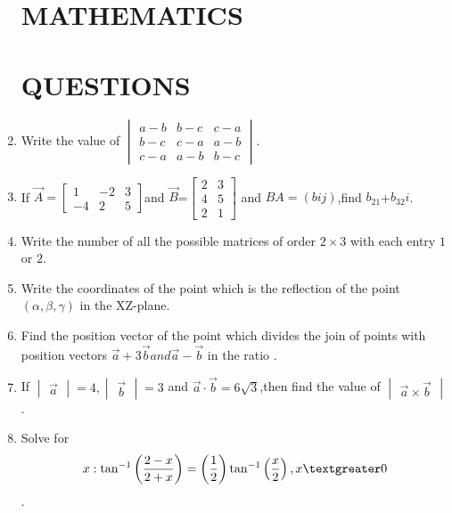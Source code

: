 \documentclass[12pt,-letter paper]{article}
\begin{document}
\begin{enumerate}
\providecommand{\mydet}[1]{\ensuremath{\begin{vmatrix}#1\end{vmatrix}}}
\providecommand{\myvec}[1]{\ensuremath{\begin{bmatrix}#1\end{bmatrix}}}
\providecommand{\cbrak}[1]{\ensuremath{\left\{#1\right\}}}
\providecommand{\brak}[1]{\ensuremath{\left(#1\right)}}

\section*{\centering MATHEMATICS}
		\section*{\centering QUESTIONS}
	\item Write the value of $\mydet{a-b&b-c&c-a\\b-c&c-a&a-b\\c-a&a-b&b-c}$.

	\item If $\vec{A}=\myvec{1&-2&3\\-4&2&5}$and $\vec{B}$=$\myvec{2&3\\4&5\\2&1}$ and $BA=\brak{bij}$,find $b_{21}$+$b_{32}i$.

\item Write the number of all the possible matrices of order $2\times3$ with each entry $1$ or $2$.

\item Write the coordinates of the point which is the reflection of the point $(\alpha,\beta,\gamma)$ in the XZ-plane.

\item Find the position vector of the point which divides the join of points with position vectors $\vec{a}+3\vec{b} and \vec{a}-\vec{b}$ in the ratio .

\item If $\mydet{\vec{a}}=4,\mydet{\vec{b}}=3$ and $\vec{a}\cdot\vec{b}=6\sqrt{3}$,then find the value of $\mydet{\vec{a}\times\vec{b}}$.

\item Solve for \begin{align} x:\tan^{-1}\brak{\frac{2-x}{2+x}}=\brak{\frac{1}{2}}\tan^{-1}\brak{\frac{x}{2}},x \textgreater 0\end{align}.
	

\end{enumerate}
\end{document}
